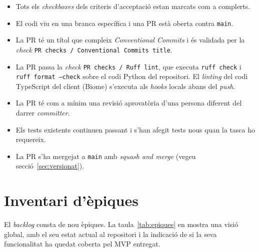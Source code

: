 \begin{itemize}
    \item Tots els \emph{checkboxes} dels criteris d'acceptació estan marcats
    com a complerts.
    \item El codi viu en una branca específica i una \ac{PR} està oberta
    contra \texttt{main}.
    \item La \ac{PR} té un títol que compleix \emph{Conventional Commits}
    \cite{conventionalcommits} i és validada per la \emph{check}
    \texttt{PR checks / Conventional Commits title}.
    \item La \ac{PR} passa la \emph{check} \texttt{PR checks / Ruff lint},
    que executa \texttt{ruff check} i \texttt{ruff format --check} sobre el
    codi Python del repositori. El \emph{linting} del codi TypeScript del
    client (Biome) s'executa als \emph{hooks} locals abans del \emph{push}.
    \item La \ac{PR} té com a mínim una revisió aprovatòria d'una persona
    diferent del darrer \emph{committer}.
    \item Els tests existents continuen passant i s'han afegit tests nous
    quan la tasca ho requereix.
    \item La \ac{PR} s'ha mergejat a \texttt{main} amb \emph{squash and
    merge} (vegeu secció~\ref{sec:versionat}).
\end{itemize}

\section{Inventari d'èpiques}
\label{sec:epiques}

El \emph{backlog} consta de nou èpiques. La taula~\ref{tab:epiques} en mostra
una visió global, amb el seu estat actual al repositori i la indicació de si
la seva funcionalitat ha quedat coberta pel \ac{MVP} entregat.

